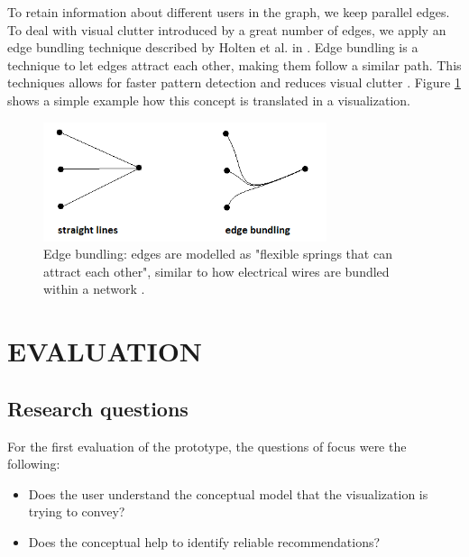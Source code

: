 \documentclass[a4paper,10pt,twocolumn]{article}
\begin{document}
To retain information about different users in the graph, we keep parallel edges. To deal with visual clutter introduced by a great number of edges, we apply an edge bundling technique described by Holten et al. in \cite{holten2009}. Edge bundling is a technique to let edges attract each other, making them follow a similar path. This techniques allows for faster pattern detection and reduces visual clutter \cite{holten2009}. Figure \ref{fig:edgebundling} shows a simple example how this concept is translated in a visualization.

\begin{figure}[!ht]
  \begin{center}
  	
    \includegraphics[width=8.3cm]{data/edge-bundling}
  \end{center}
  \caption{Edge bundling: edges are modelled as "flexible springs that can attract each other", similar to how electrical wires are bundled within a network \cite{holten2009}.}
  \label{fig:edgebundling}
\end{figure}


\section*{EVALUATION}

\subsection*{Research questions}

For the first evaluation of the prototype, the questions of focus were the following:

\begin{itemize}
	\item Does the user understand the conceptual model that the visualization is trying to convey?
	\item Does the conceptual help to identify reliable recommendations?
\end{itemize}
\end{document}
